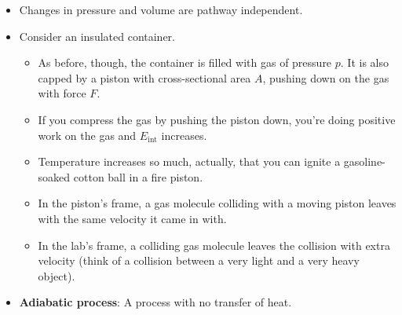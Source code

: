 \documentclass[../notes.tex]{subfiles}
\begin{document}
\begin{itemize}
    \item Changes in pressure and volume are pathway independent.
    \item Consider an insulated container.
    \begin{itemize}
        \item As before, though, the container is filled with gas of pressure $p$. It is also capped by a piston with cross-sectional area $A$, pushing down on the gas with force $F$.
        \item If you compress the gas by pushing the piston down, you're doing positive work on the gas and $E_\text{int}$ increases.
        \item Temperature increases so much, actually, that you can ignite a gasoline-soaked cotton ball in a fire piston.
        \item In the piston's frame, a gas molecule colliding with a moving piston leaves with the same velocity it came in with.
        \item In the lab's frame, a colliding gas molecule leaves the collision with extra velocity (think of a collision between a very light and a very heavy object).
    \end{itemize}
    \item \textbf{Adiabatic process}: A process with no transfer of heat.
\end{itemize}
\end{document}
